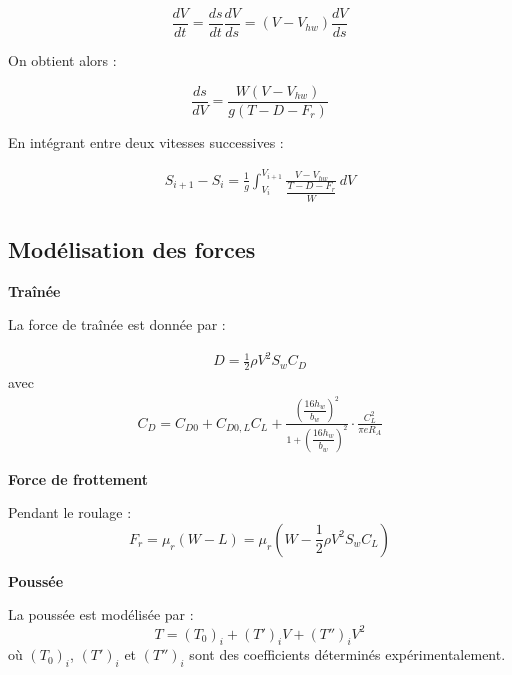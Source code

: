 			\begin{equation}
				\frac{dV}{dt}=\frac{ds}{dt}\frac{dV}{ds}=(V-V_{hw})\frac{dV}{ds}
			\end{equation}
			
			On obtient alors :
			
			\begin{equation}
				\frac{ds}{dV}=\frac{W(V-V_{hw})}{g(T-D-F_r)}
			\end{equation}
			
			En intégrant entre deux vitesses successives :
			
			\begin{align}
				S_{i+1}-S_i= \frac{1}{g} \int_{V_i}^{V_{i+1}} \frac{V-V_{hw}} {\dfrac{T-D-F_r}{W}} \, dV
			\end{align}
			
		\subsection{Modélisation des forces}
		
			\textbf{Traînée}
			
			La force de traînée est donnée par :
			
			\begin{align}
				D=\frac{1}{2}\rho V^2 S_w C_D
			\end{align}
			avec
			\begin{align}
				C_D= C_{D0}	+	C_{D0,L}C_L +
				\frac{	\left(\dfrac{16h_w}{b_w}\right)^2  }{ 1+\left(\dfrac{16h_w}{b_w}\right)^2 }	\cdot \frac{C_L^2}{\pi e R_A}
			\end{align}
			
			
			\vspace{0.5cm}
			
			\textbf{Force de frottement}
			
			Pendant le roulage :
			\begin{equation}
				F_r= \mu_r(W-L)	= \mu_r	\left( 	W-\frac{1}{2}\rho V^2 S_w C_L  \right)
			\end{equation}
			
			\vspace{0.5cm}
			
			\textbf{Poussée}
			
			La poussée est modélisée par :
			\begin{equation}
				T=(T_0)_i+(T')_iV+(T'')_iV^2
			\end{equation}
			où $(T_0)_i$, $(T')_i$ et $(T'')_i$ sont des coefficients déterminés expérimentalement.
				
